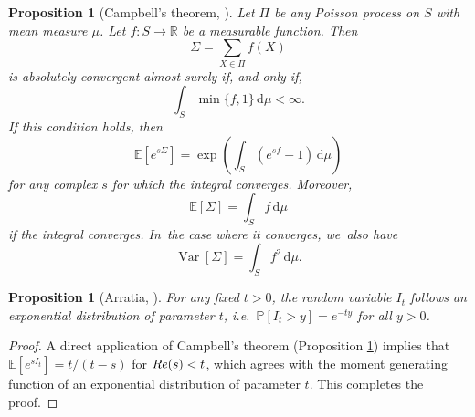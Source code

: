 \documentclass[10pt,a4paper]{article}
\providecommand{\ie}{i.e.\ }
\newcommand{\RR}{\mathbb{R}}
\newcommand{\PP}{\mathbb{P}}
\newcommand{\EE}{\mathbb{E}}
\newcommand{\prob}[1]{\PP[ #1 ]}
\newcommand{\riemint}[4]{\int_{#1}^{#2}\! #3 \, \mathrm{d}#4}
\renewcommand{\Re}{\textup{Re}}
\DeclareMathOperator{\vard}{Var}
\theoremstyle{plain}
\newtheorem{prop}[cor]{Proposition}
\theoremstyle{definition}
\begin{document}
\begin{prop}[Campbell's theorem, {\cite[\S3.2]{Kingman93}}]
\label{prel:campbell}
Let $\Pi$ be any Poisson process on $S$ with mean measure $\mu$. Let $f\colon S \to \RR$ be a measurable function. Then
\[
\Sigma = \sum_{X \in \Pi} f(X)
\]
is absolutely convergent almost surely if, and only if,
\[
\riemint{S}{}{\min\{f, 1\}}{\mu} < \infty.
\]
If this condition holds, then
\[
\EE[e^{s\Sigma}] = \exp\left(\riemint{S}{}{(e^{sf} - 1)}{\mu}\right)
\]
for any complex $s$ for which the integral converges. Moreover,
\[
\EE[\Sigma] = \riemint{S}{}{f}{\mu}
\]
if the integral converges. In~the case where it converges, we~also have
\[
\vard[\Sigma] = \riemint{S}{}{f^2}{\mu}.
\]
\end{prop}

\begin{prop}[Arratia, \cite{Arratia02}]
\label{prop:icexponential}
For any fixed $t > 0$, the random variable $I_t$ follows an exponential distribution of parameter $t$, \ie $\prob{I_t > y} = e^{-ty}$ for all $y > 0$.
\end{prop}

\begin{proof}
A direct application of Campbell's theorem (Proposition \ref{prel:campbell}) implies that $\EE[e^{sI_t}]=t/(t-s)$ for $\Re(s)<t$, which agrees with the moment generating function of an exponential distribution of parameter $t$. This completes the proof.
\end{proof}
\end{document}
